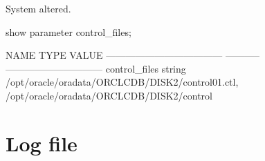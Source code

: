 \documentclass{article}
\begin{document}
\begin{enumerate}
\begin{messageshell}
System altered.

\end{messageshell}
\begin{sqlshell}
show parameter control_files;
\end{sqlshell}
\begin{messageshell}

NAME                                 TYPE        VALUE
------------------------------------ ----------- ------------------------------
control_files                          string        /opt/oracle/oradata/ORCLCDB/DISK2/control01.ctl, /opt/oracle/oradata/ORCLCDB/DISK2/control
\end{messageshell}
\end{enumerate}
\section{Log file}
\end{document}

